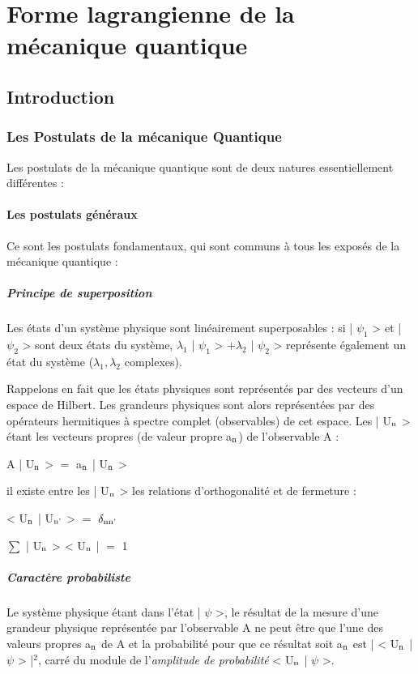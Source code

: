 \part{Forme lagrangienne de la mécanique quantique}%

 \chapter{Introduction}
\section{Les Postulats de la mécanique Quantique}

Les postulats de la mécanique quantique sont de deux
natures essentiellement différentes :
\subsection{Les postulats généraux}
Ce sont les postulats fondamentaux, qui
sont communs à tous les exposés de la mécanique quantique :

\subsubsection{Principe de superposition}
Les états d'un système
physique sont linéairement superposables : si | $\psi_1$ > et | $\psi_2$ > sont
deux états du système, $\lambda_1$ | $\psi_1$ > $+ \lambda_2$ | $\psi_2$ >
représente également un état du système ($\lambda_1, \lambda_2$ complexes).

Rappelons en fait que les états physiques sont représentés
par des vecteurs d'un espace de Hilbert. Les grandeurs physiques sont
alors représentées par des opérateurs hermitiques à spectre complet
(observables) de cet espace. Les | U$_{\text{n}}$ > étant les vecteurs propres
(de valeur propre a$_{\text{n}}$) de l'observable A :
\begin{center}
A | U$_{\text{n}}$ > $=$ a$_{\text{n}}$ | U$_{\text{n}}$ >
\end{center}
il existe entre les | U$_{\text{n}}$ > les relations d'orthogonalité et de
fermeture :
\begin{center}
< U$_{\text{n}}$ | U$_{\text{n'}}$ > $=$ $\delta_{\text{nn'}}$

$\sum$ | U$_{\text{n}}$ > < U$_{\text{n}}$ | $=$ 1
\end{center}

\subsubsection{Caractère probabiliste}
Le système physique étant dans
l'état | $\psi$ >, le résultat de la mesure d'une grandeur physique représentée
par l'observable A ne peut être que l'une des valeurs propres
a$_{\text{n}}$ de A et la probabilité pour que ce résultat soit a$_{\text{n}}$ est
| < U$_{\text{n}}$ | $\psi$ > |$^2$, carré du module de l'{\it amplitude de probabilité}
< U$_{\text{n}}$ | $\psi$ >.
